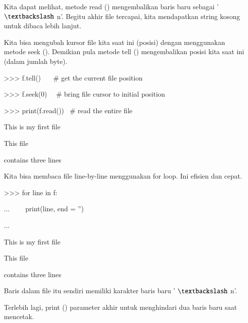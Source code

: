 \documentclass[a4paper,12pt]{report}
\begin{document}
\vspace{12pt}
\noindent 
Kita dapat melihat, metode read () mengembalikan baris baru sebagai ' $  \textbackslash  $ n'. Begitu akhir file tercapai, kita mendapatkan string kosong untuk dibaca lebih lanjut. \par
\vspace{12pt}
\noindent 
Kita bisa mengubah kursor file kita saat ini (posisi) dengan menggunakan metode seek (). Demikian pula metode tell () mengembalikan posisi kita saat ini (dalam jumlah byte). \par
\vspace{12pt}
\noindent 
>>> f.tell()~~~  $  \#  $ get the current file position \par
{} \par
\vspace{12pt}
\noindent 
>>> f.seek(0)~~  $  \#  $ bring file cursor to initial position \par
{} \par
\vspace{12pt}
\noindent 
>>> print(f.read())~  $  \#  $ read the entire file \par
\noindent 
This is my first file \par
\noindent 
This file \par
\noindent 
contains three lines \par
\vspace{12pt}
\vspace{16pt}
\noindent 
Kita bisa membaca file line-by-line menggunakan for loop. Ini efisien dan cepat. \par
\vspace{12pt}
\noindent 
>>> for line in f: \par
\noindent 
...~~~~ print(line, end = '') \par
\noindent 
... \par
\noindent 
This is my first file \par
\noindent 
This file \par
\noindent 
contains three lines \par
\vspace{12pt}
\vspace{12pt}
\noindent 
Baris dalam file itu sendiri memiliki karakter baris baru ' $  \textbackslash  $ n'. \par
\vspace{12pt}
\noindent 
Terlebih lagi, print () parameter akhir untuk menghindari dua baris baru saat mencetak. \par
\end{document}

